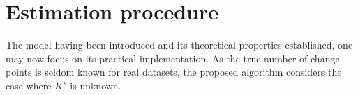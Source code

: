 

\section{Estimation procedure}\label{chp:4:2}

The model having been introduced and its theoretical properties established, one may now focus on its practical implementation. As the true number of change-points is seldom known for real datasets, the proposed algorithm considers the case where $K^{\star}$ is unknown. 

